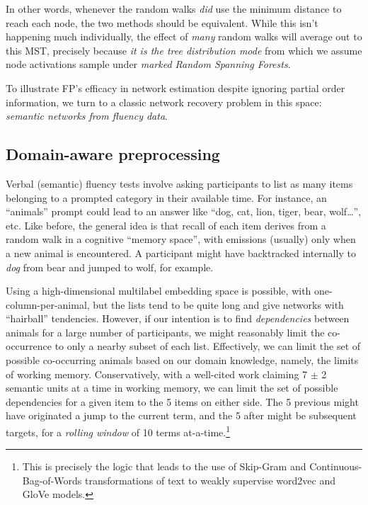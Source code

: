 \documentclass[%
	12pt,
		oneside,
		letterpaper
]{book}
\begin{document}
In other words, whenever the random walks \emph{did} use the minimum distance to reach each node, the two methods should be equivalent.
While this isn't happening much individually, the effect of \emph{many} random walks will average out to this MST, precisely because \emph{it is the tree distribution mode} from which we assume node activations sample under \emph{marked Random Spanning Forests}.

To illustrate FP's efficacy in network estimation despite ignoring partial order information, we turn to a classic network recovery problem in this space: \emph{semantic networks from fluency data}\autocite{newdissimilaritymeasure_Prescott2006,Estimatingsemanticnetworks_Zemla2018,semanticorganizationanimal_Goni2011}.

\subsection{Domain-aware preprocessing}\label{domain-aware-preprocessing}

Verbal (semantic) fluency tests involve asking participants to list as many items belonging to a prompted category in their available time.
For instance, an ``animals'' prompt could lead to an answer like ``dog, cat, lion, tiger, bear, wolf\ldots{}'', etc.
Like before, the general idea is that recall of each item derives from a random walk in a cognitive ``memory space'', with emissions (usually) only when a new animal is encountered.
A participant might have backtracked internally to \emph{dog} from bear and jumped to wolf, for example.

Using a high-dimensional multilabel embedding space is possible, with one-column-per-animal, but the lists tend to be quite long and give networks with ``hairball'' tendencies.
However, if our intention is to find \emph{dependencies} between animals for a large number of participants, we might reasonably limit the co-occurrence to only a nearby subset of each list.
Effectively, we can limit the set of possible co-occurring animals based on our domain knowledge, namely, the limits of working memory.
Conservatively, with a well-cited work claiming 7 \(\pm\) 2 semantic units at a time in working memory\autocite{magicalnumberseven_Miller1956}, we can limit the set of possible dependencies for a given item to the 5 items on either side.
The 5 previous might have originated a jump to the current term, and the 5 after might be subsequent targets, for a \emph{rolling window} of 10 terms at-a-time.\footnote{
  This is precisely the logic that leads to the use of Skip-Gram and Continuous-Bag-of-Words transformations of text to weakly supervise word2vec and GloVe models\autocite{GloveGlobalvectors_Pennington2014,Efficientestimationword_Mikolov2013}.}
\end{document}

